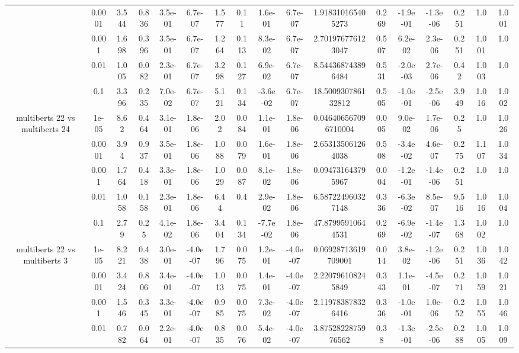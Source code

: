 \begin{tabular}{|c|c|c|c|c|c|c|c|c|c|c|c|c|c|c|c|c|}
 & 0.0001 & 3.544 & 0.836 & 3.5e-01 & 6.7e-07 & 1.577 & 0.11 & 1.6e-01 & 6.7e-07 & 1.918310165405273 & 0.269 & -1.9e-01 & -1.3e-06 & 0.251 & 1.0 & 1.001 \\
 & 0.001 & 1.698 & 0.396 & 3.5e-01 & 6.7e-07 & 1.264 & 0.113 & 8.3e-02 & 6.7e-07 & 2.701976776123047 & 0.507 & 6.2e-02 & 2.3e-06 & 0.251 & 1.001 & 1.0 \\
 & 0.01 & 1.005 & 0.082 & 2.3e-01 & 6.7e-07 & 3.298 & 0.127 & 6.9e-02 & 6.7e-07 & 8.544368743896484 & 0.531 & -2.0e-03 & 2.7e-06 & 0.42 & 1.003 & 1.0 \\
 & 0.1 & 3.396 & 0.235 & 7.0e-02 & 6.7e-07 & 5.121 & 0.134 & -3.6e-02 & 6.7e-07 & 18.500930786132812 & 0.505 & -1.0e-01 & -2.5e-06 & 3.949 & 1.016 & 1.002 \\
\hline
\multirow{5}{*}{multiberts 22 vs multiberts 24} & 1e-05 & 8.62 & 0.464 & 3.1e-01 & 1.8e-06 & 2.02 & 0.084 & 1.1e-01 & 1.8e-06 & 0.046406567096710004 & 0.005 & 9.0e-02 & 1.7e-06 & 0.25 & 1.0 & 1.026 \\
 & 0.0001 & 3.94 & 0.937 & 3.5e-01 & 1.8e-06 & 1.088 & 0.079 & 1.6e-01 & 1.8e-06 & 2.653135061264038 & 0.508 & -3.4e-02 & 4.6e-07 & 0.275 & 1.107 & 1.034 \\
 & 0.001 & 1.764 & 0.418 & 3.3e-01 & 1.8e-06 & 1.029 & 0.087 & 8.1e-02 & 1.8e-06 & 0.094731643795967 & 0.004 & -1.2e-01 & -1.4e-06 & 0.251 & 1.0 & 1.0 \\
 & 0.01 & 1.058 & 0.158 & 2.3e-01 & 1.8e-06 & 6.44 & 0.4 & 2.9e-02 & 1.8e-06 & 6.587224960327148 & 0.336 & -6.3e-02 & 8.5e-07 & 9.516 & 1.016 & 1.004 \\
 & 0.1 & 2.79 & 0.25 & 4.1e-02 & 1.8e-06 & 3.404 & 0.134 & -7.7e-02 & 1.8e-06 & 47.87995910644531 & 0.269 & -6.9e-02 & -1.4e-07 & 1.368 & 1.002 & 1.0 \\
\hline
\multirow{5}{*}{multiberts 22 vs multiberts 3} & 1e-05 & 8.221 & 0.438 & 3.0e-01 & -4.0e-07 & 1.796 & 0.075 & 1.2e-01 & -4.0e-07 & 0.06928713619709001 & 0.014 & 3.8e-02 & -1.2e-06 & 0.251 & 1.036 & 1.042 \\
 & 0.0001 & 3.424 & 0.806 & 3.4e-01 & -4.0e-07 & 1.013 & 0.075 & 1.4e-01 & -4.0e-07 & 2.220796108245849 & 0.343 & 1.1e-01 & -4.5e-07 & 0.271 & 1.059 & 1.021 \\
 & 0.001 & 1.546 & 0.345 & 3.3e-01 & -4.0e-07 & 0.985 & 0.075 & 7.3e-02 & -4.0e-07 & 2.119783878326416 & 0.336 & -1.0e-01 & 1.0e-06 & 0.252 & 1.055 & 1.046 \\
 & 0.01 & 0.782 & 0.064 & 2.2e-01 & -4.0e-07 & 0.835 & 0.076 & 5.4e-02 & -4.0e-07 & 3.8752822875976562 & 0.38 & -1.3e-01 & -2.5e-06 & 0.288 & 1.005 & 1.009 \\

\end{tabular}
